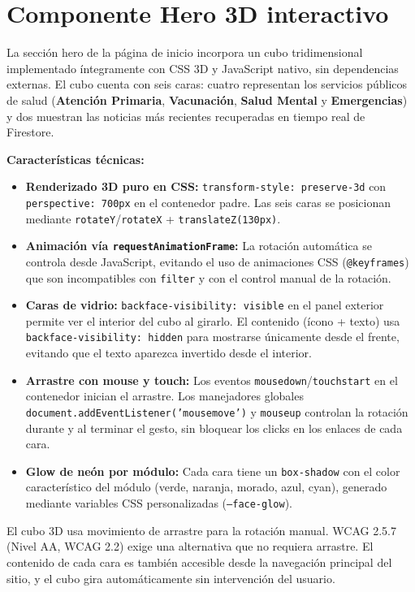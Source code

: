 \documentclass[12pt, a4paper]{report}
\begin{document}
\section{Componente Hero 3D interactivo}

La sección hero de la página de inicio incorpora un cubo tridimensional implementado íntegramente con CSS 3D y JavaScript nativo, sin dependencias externas. El cubo cuenta con seis caras: cuatro representan los servicios públicos de salud (\textbf{Atención Primaria}, \textbf{Vacunación}, \textbf{Salud Mental} y \textbf{Emergencias}) y dos muestran las noticias más recientes recuperadas en tiempo real de Firestore.

\textbf{Características técnicas:}
\begin{itemize}
  \item \textbf{Renderizado 3D puro en CSS:} \texttt{transform-style: preserve-3d} con \texttt{perspective: 700px} en el contenedor padre. Las seis caras se posicionan mediante \texttt{rotateY}/\texttt{rotateX} + \texttt{translateZ(130px)}.
  \item \textbf{Animación vía \texttt{requestAnimationFrame}:} La rotación automática se controla desde JavaScript, evitando el uso de animaciones CSS (\texttt{@keyframes}) que son incompatibles con \texttt{filter} y con el control manual de la rotación.
  \item \textbf{Caras de vidrio:} \texttt{backface-visibility: visible} en el panel exterior permite ver el interior del cubo al girarlo. El contenido (ícono + texto) usa \texttt{backface-visibility: hidden} para mostrarse únicamente desde el frente, evitando que el texto aparezca invertido desde el interior.
  \item \textbf{Arrastre con mouse y touch:} Los eventos \texttt{mousedown}/\texttt{touchstart} en el contenedor inician el arrastre. Los manejadores globales \texttt{document.addEventListener('mousemove')} y \texttt{mouseup} controlan la rotación durante y al terminar el gesto, sin bloquear los clicks en los enlaces de cada cara.
  \item \textbf{Glow de neón por módulo:} Cada cara tiene un \texttt{box-shadow} con el color característico del módulo (verde, naranja, morado, azul, cyan), generado mediante variables CSS personalizadas (\texttt{--face-glow}).
\end{itemize}

\begin{warnbox}
El cubo 3D usa movimiento de arrastre para la rotación manual. WCAG 2.5.7 (Nivel AA, WCAG 2.2) exige una alternativa que no requiera arrastre. El contenido de cada cara es también accesible desde la navegación principal del sitio, y el cubo gira automáticamente sin intervención del usuario.
\end{warnbox}
\end{document}
